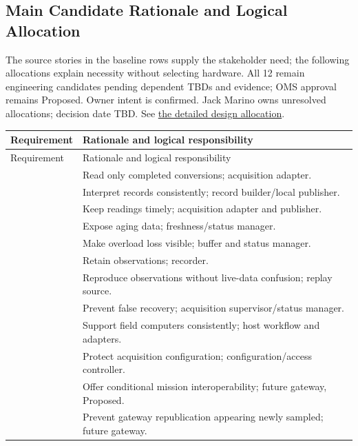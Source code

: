 \subsection{Main Candidate Rationale and Logical Allocation}
\label{Section:MainRationale}
The source stories in the baseline rows supply the stakeholder need; the following
allocations explain necessity without selecting hardware. All 12 remain
engineering candidates pending dependent TBDs and evidence; OMS approval remains
Proposed. Owner intent is confirmed. Jack Marino owns unresolved allocations;
decision date TBD. See \hyperref[Table:SoftwareAllocation]{the detailed design allocation}.
\begin{tabularx}{\linewidth}{L{2.8cm}Y}
\caption{Main Candidate Rationale and Allocation\label{Table:MainRationale}}\\
\toprule Requirement & Rationale and logical responsibility\\
\midrule\endfirsthead
Requirement & Rationale and logical responsibility\\
\midrule\endhead
\bottomrule\endlastfoot
{} & Read only completed conversions; acquisition adapter.\\
 & Interpret records consistently; record builder/local publisher.\\
 & Keep readings timely; acquisition adapter and publisher.\\
 & Expose aging data; freshness/status manager.\\
 & Make overload loss visible; buffer and status manager.\\
 & Retain observations; recorder.\\
 & Reproduce observations without live-data confusion; replay source.\\
 & Prevent false recovery; acquisition supervisor/status manager.\\
 & Support field computers consistently; host workflow and adapters.\\
 & Protect acquisition configuration; configuration/access controller.\\
 & Offer conditional mission interoperability; future gateway, Proposed.\\
 & Prevent gateway republication appearing newly sampled; future gateway.\\
\end{tabularx}
